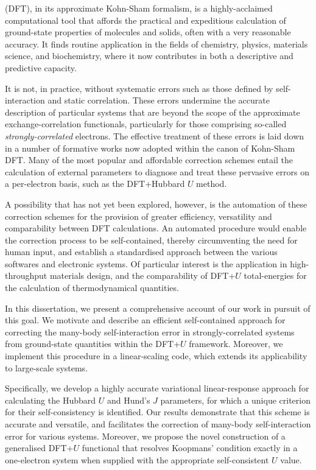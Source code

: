  (DFT), 
{
in its approximate Kohn-Sham formalism, 
is a highly-acclaimed computational tool that 
affords the practical and expeditious  
calculation of ground-state properties 
of molecules and solids, 
often with a very reasonable accuracy.
%
It finds routine application 
in the fields of chemistry, 
physics, 
materials science, 
and biochemistry, 
where it now contributes 
in both 
a descriptive and predictive capacity.}

{
It is not, in practice, without systematic errors 
such as those defined by self-interaction and static correlation.
%
These errors undermine the accurate description 
of particular systems that are beyond the scope   
of the approximate exchange-correlation functionals, 
particularly for those comprising 
so-called {\it strongly-correlated} electrons. 
%
The effective treatment of these errors 
is laid down in a number of formative works 
now adopted within the canon of Kohn-Sham DFT. 
%
Many of the most popular and affordable correction schemes 
entail the calculation of external parameters 
to diagnose and treat these pervasive errors 
on a per-electron basis, 
such as the DFT+Hubbard $U$ method.}

{
A possibility that has not yet been explored, however, 
is the automation of these correction schemes  
for the provision of greater efficiency, 
versatility and comparability between 
DFT calculations.
%
An automated procedure   
would enable the correction process to be self-contained, 
thereby circumventing the need for human input,  
and establish a standardised approach  
between the various softwares and electronic systems.
%
Of particular interest is the application 
in high-throughput materials design, 
and the comparability of DFT+$U$ 
total-energies for the calculation  
of thermodynamical quantities.}

{
In this dissertation, 
we present a comprehensive account 
of our work in pursuit of this goal.
%
We motivate and describe an 
efficient self-contained approach 
for correcting the many-body self-interaction error 
in strongly-correlated systems 
from ground-state quantities 
within the DFT+$U$ framework.
%
Moreover, 
we implement this procedure in a linear-scaling code, 
which extends its applicability to large-scale systems.}

{
Specifically, 
we develop a highly accurate 
variational linear-response approach  
for calculating the 
Hubbard $U$ and Hund's $J$ parameters, 
for which a unique criterion for 
their self-consistency is identified.
% 
Our results demonstrate that this scheme 
is accurate and versatile, 
and facilitates the correction of 
many-body self-interaction error 
for various systems.
%
Moreover, 
we propose the novel construction of a 
generalised DFT+$U$ functional 
that resolves Koopmans' condition exactly 
in a one-electron system 
when supplied with the appropriate 
self-consistent $U$ value.}

